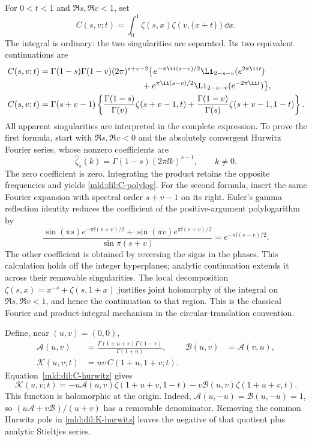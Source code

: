For $0<t<1$ and $\Re s,\Re v<1$, set
\[
 C(s,v;t)=\int_0^1\zeta(s,x)\zeta(v,\{x+t\})\dd x.
\]
The integral is ordinary: the two singularities are separated. Its two
equivalent continuations are
\begin{align}
 C(s,v;t)={}&\Gamma(1-s)\Gamma(1-v)(2\pi)^{s+v-2}
 \bigl\{e^{-\pi\ii(s-v)/2}\Li_{2-s-v}(e^{2\pi\ii t})\notag\\
 &\hspace{38mm}+e^{\pi\ii(s-v)/2}\Li_{2-s-v}(e^{-2\pi\ii t})\bigr\},
 \label{mld:dil:C-polylog}\\
 C(s,v;t)={}&\Gamma(s+v-1)
 \left\{\frac{\Gamma(1-s)}{\Gamma(v)}\zeta(s+v-1,t)
       +\frac{\Gamma(1-v)}{\Gamma(s)}\zeta(s+v-1,1-t)\right\}.
 \label{mld:dil:C-hurwitz}
\end{align}
All apparent singularities are interpreted in the complete expression.
To prove the first formula, start with $\Re s,\Re v<0$ and the absolutely
convergent Hurwitz Fourier series, whose nonzero coefficients are
\[
 \widehat\zeta_s(k)=\Gamma(1-s)(2\pi\ii k)^{s-1},\qquad k\ne0.
\]
The zero coefficient is zero. Integrating the product retains the
opposite frequencies and yields \eqref{mld:dil:C-polylog}. For the second
formula, insert the same Fourier expansion with spectral order $s+v-1$
on its right. Euler's gamma reflection identity reduces the coefficient
of the positive-argument polylogarithm by
\[
 \frac{\sin(\pi s)e^{-\pi\ii(s+v)/2}
       +\sin(\pi v)e^{\pi\ii(s+v)/2}}{\sin\pi(s+v)}
       =e^{-\pi\ii(s-v)/2}.
\]
The other coefficient is obtained by reversing the signs in the phases.
This calculation holds off the integer hyperplanes; analytic continuation
extends it across their removable singularities. The local decomposition
$\zeta(s,x)=x^{-s}+\zeta(s,1+x)$ justifies joint holomorphy of the
integral on $\Re s,\Re v<1$, and hence the continuation to that region.
This is the classical Fourier and product-integral mechanism
\cite{DLMFhurwitz,EspinosaMoll} in the circular-translation convention.

Define, near $(u,v)=(0,0)$,
\begin{align*}
 \mathcal A(u,v)&=
  \frac{\Gamma(1+u+v)\Gamma(1-v)}{\Gamma(1+u)},
 &\mathcal B(u,v)&=\mathcal A(v,u),\\
 \mathcal K(u,v;t)&=uv\,C(1+u,1+v;t).
\end{align*}
Equation~\eqref{mld:dil:C-hurwitz} gives
\begin{equation}
 \mathcal K(u,v;t)=
 -u\mathcal A(u,v)\zeta(1+u+v,1-t)
 -v\mathcal B(u,v)\zeta(1+u+v,t).
 \label{mld:dil:K-hurwitz}
\end{equation}
This function is holomorphic at the origin. Indeed,
$\mathcal A(u,-u)=\mathcal B(u,-u)=1$, so
$(u\mathcal A+v\mathcal B)/(u+v)$ has a removable denominator. Removing
the common Hurwitz pole in \eqref{mld:dil:K-hurwitz} leaves the negative of that
quotient plus analytic Stieltjes series.

